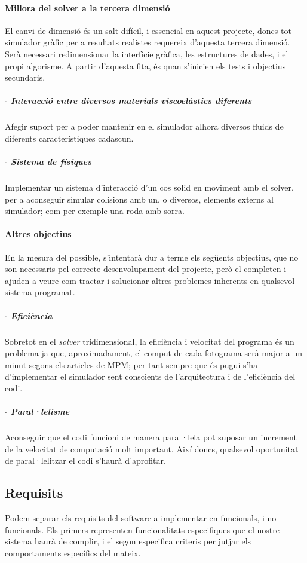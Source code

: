 \documentclass[a4paper]{report}
\begin{document}
	\paragraph{Millora del solver a la tercera dimensió} El canvi de dimensió és un salt difícil, i essencial en aquest projecte, doncs tot simulador gràfic per a resultats realistes requereix d'aquesta tercera dimensió. Serà necessari redimensionar la interfície gràfica, les estructures de dades, i el propi algorisme.
	\newline
	A partir d'aquesta fita, és quan s'inicien els tests i objectius secundaris.
	\subparagraph[Interacció viscoelàstica]{$\cdot$ Interacció entre diversos materials viscoelàstics diferents} Afegir suport per a poder mantenir en el simulador alhora diversos fluids de diferents característiques cadascun.
	\subparagraph[Sistema de físiques]{$\cdot$ Sistema de físiques} Implementar un sistema d'interacció d'un cos solid en moviment amb el solver, per a aconseguir simular colisions amb un, o diversos, elements externs al simulador; com per exemple una roda amb sorra.
	
	\paragraph{Altres objectius} En la mesura del possible, s'intentarà dur a terme els següents objectius, que no son necessaris pel correcte desenvolupament del projecte, però el completen i ajuden a veure com tractar i solucionar altres problemes inherents en qualsevol sistema programat.
	\subparagraph[Eficiència]{$\cdot$ Eficiència} Sobretot en el \textit{solver} tridimensional, la eficiència i velocitat del programa és un problema ja que, aproximadament, el comput de cada fotograma serà major a un minut segons els articles de MPM; per tant sempre que és pugui s'ha d'implementar el simulador sent conscients de l'arquitectura i de l'eficiència del codi.
	\subparagraph[Paral·lelisme]{$\cdot$ Paral·lelisme} Aconseguir que el codi funcioni de manera paral·lela pot suposar un increment de la velocitat de computació molt important. Així doncs, qualsevol oportunitat de paral·lelitzar el codi s'haurà d'aprofitar.
	
	
	\subsection{Requisits}
	Podem separar els requisits del software a implementar en funcionals, i no funcionals. Els primers representen funcionalitats especifiques que el nostre sistema haurà de complir, i el segon especifica criteris per jutjar els comportaments específics del mateix.
	
\end{document}
